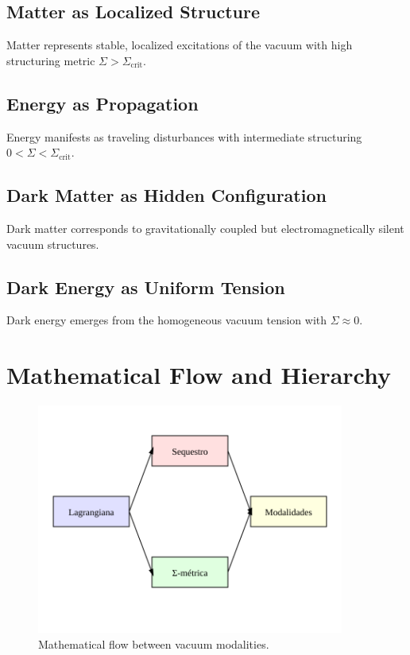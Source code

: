 \documentclass[12pt,a4paper]{article}
\newcommand{\structuring}{\Sigma}
\begin{document}
\subsection{Matter as Localized Structure}
Matter represents stable, localized excitations of the vacuum with high structuring metric $\structuring > \structuring_{\text{crit}}$.

\subsection{Energy as Propagation}
Energy manifests as traveling disturbances with intermediate structuring $0 < \structuring < \structuring_{\text{crit}}$.

\subsection{Dark Matter as Hidden Configuration}
Dark matter corresponds to gravitationally coupled but electromagnetically silent vacuum structures.

\subsection{Dark Energy as Uniform Tension}
Dark energy emerges from the homogeneous vacuum tension with $\structuring \approx 0$.

\section{Mathematical Flow and Hierarchy}

\begin{figure}[h]
\centering
\includegraphics[width=0.9\textwidth]{../figures/fig2_flux.svg}
\caption{Mathematical flow between vacuum modalities.}
\label{fig:flow}
\end{figure}
\end{document}
